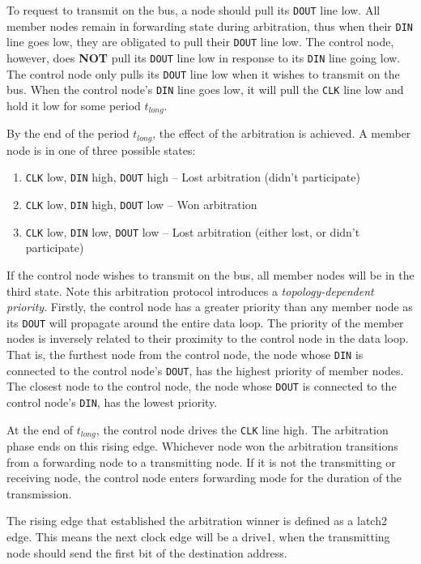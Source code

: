 To request to transmit on the bus, a node should pull its {\tt DOUT} line low.
All member nodes remain in forwarding state during arbitration, thus when
their {\tt DIN} line goes low, they are obligated to pull their {\tt DOUT}
line low. The control node, however, does {\bf NOT} pull its {\tt DOUT} line
low in response to its {\tt DIN} line going low. The control node only pulls
its {\tt DOUT} line low when it wishes to transmit on the bus. When the
control node's {\tt DIN} line goes low, it will pull the {\tt CLK} line low
and hold it low for some period $t_{long}$.

By the end of the period $t_{long}$, the effect of the arbitration is
achieved. A member node is in one of three possible states:
\begin{enumerate}
  \item {\tt CLK} low, {\tt DIN} high, {\tt DOUT} high -- Lost arbitration
    (didn't participate)
  \item {\tt CLK} low, {\tt DIN} high, {\tt DOUT} low -- Won arbitration
  \item {\tt CLK} low, {\tt DIN} low, {\tt DOUT} low -- Lost arbitration
    (either lost, or didn't participate)
\end{enumerate}
If the control node wishes to transmit on the bus, all member nodes will be in
the third state. Note this arbitration protocol introduces a {\em
topology-dependent priority}. Firstly, the control node has a greater priority
than any member node as its {\tt DOUT} will propagate around the entire data
loop. The priority of the member nodes is inversely related to their proximity
to the control node in the data loop. That is, the furthest node from the
control node, the node whose {\tt DIN} is connected to the control node's
{\tt DOUT}, has the highest priority of member nodes. The closest node to the
control node, the node whose {\tt DOUT} is connected to the control node's
{\tt DIN}, has the lowest priority.

At the end of $t_{long}$, the control node drives the {\tt CLK} line high. The
arbitration phase ends on this rising edge. Whichever node won the arbitration
transitions from a forwarding node to a transmitting node. If it is not the
transmitting or receiving node, the control node enters forwarding mode for
the duration of the transmission.

The rising edge that established the arbitration winner
is defined as a {\sc latch2} edge. This means the next clock edge will be a
{\sc drive1}, when the transmitting node should send the first bit of the
destination address.

